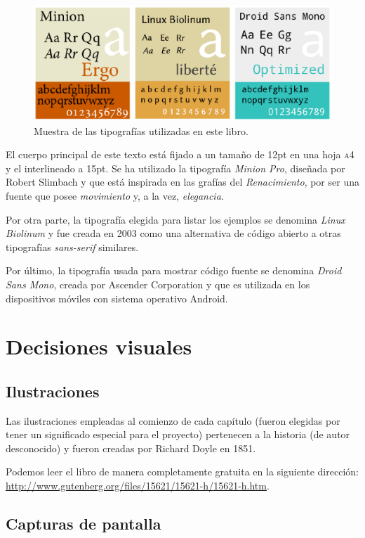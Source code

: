 \begin{figure}
\includegraphics[width=\linewidth]{../graphics/fig_tipografias_usadas}
\caption{Muestra de las tipografías utilizadas en este libro.}
\end{figure}

El cuerpo principal de este texto está fijado a un tamaño de 12pt en una hoja \textsc{a4} y el interlineado a 15pt. Se ha utilizado la tipografía \textit{Minion Pro}, diseñada por Robert Slimbach y que está inspirada en las grafías del \textit{Renacimiento}, por ser una fuente que posee \textit{movimiento} y, a la vez, \textit{elegancia}.

Por otra parte, la tipografía elegida para listar los ejemplos se denomina \textit{Linux Biolinum} y fue creada en 2003 como una alternativa de código abierto a otras tipografías \textit{sans-serif} similares.

Por último, la tipografía usada para mostrar código fuente se denomina \textit{Droid Sans Mono}, creada por Ascender Corporation y que es utilizada en los dispositivos móviles con sistema operativo Android.

\section{Decisiones visuales}

\subsection{Ilustraciones}
Las ilustraciones empleadas al comienzo de cada capítulo (fueron elegidas por tener un significado especial para el proyecto) pertenecen a la historia  (de autor desconocido) y fueron creadas por Richard Doyle en 1851. 

Podemos leer el libro de manera completamente gratuita en la siguiente dirección: \url{http://www.gutenberg.org/files/15621/15621-h/15621-h.htm}. 

\subsection{Capturas de pantalla}

